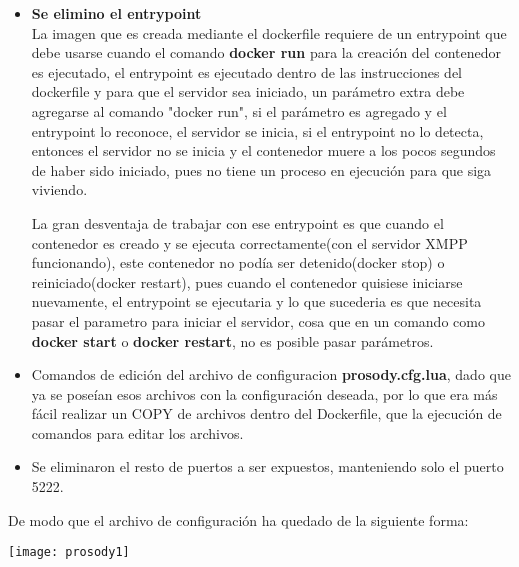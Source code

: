 \documentclass[10pt,letterpaper]{article}
\begin{document}
\begin{itemize}
\item \textbf{Se elimino el entrypoint}\\
La imagen que es creada mediante el dockerfile requiere de un entrypoint que debe usarse cuando el comando \textbf{docker run} para la creación del contenedor es ejecutado, el entrypoint es ejecutado dentro de las instrucciones del dockerfile y para que el servidor sea iniciado, un parámetro extra debe agregarse al comando "docker run", si el parámetro es agregado y el entrypoint lo reconoce, el servidor se inicia, si el entrypoint no lo detecta, entonces el servidor no se inicia y el contenedor muere a los pocos segundos de haber sido iniciado, pues no tiene un proceso en ejecución para que siga viviendo.

La gran desventaja de trabajar con ese entrypoint es que cuando el contenedor es creado y se ejecuta correctamente(con el servidor XMPP funcionando), este contenedor no podía ser detenido(docker stop) o reiniciado(docker restart), pues cuando el contenedor quisiese iniciarse nuevamente, el entrypoint se ejecutaria y lo que sucederia es que necesita pasar el parametro para iniciar el servidor, cosa que en un comando como \textbf{docker start} o \textbf{docker restart}, no es posible pasar parámetros.

\item Comandos de edición del archivo de configuracion \textbf{prosody.cfg.lua}, dado que ya se poseían esos archivos con la configuración deseada, por lo que era más fácil realizar un COPY de archivos dentro del Dockerfile, que la ejecución de comandos para editar los archivos.

\item Se eliminaron el resto de puertos a ser expuestos, manteniendo solo el puerto 5222.
\end{itemize}

De modo que el archivo de configuración ha quedado de la siguiente forma:

\begin{center}
\texttt{[image: prosody1]}
\end{center}
\end{document}
